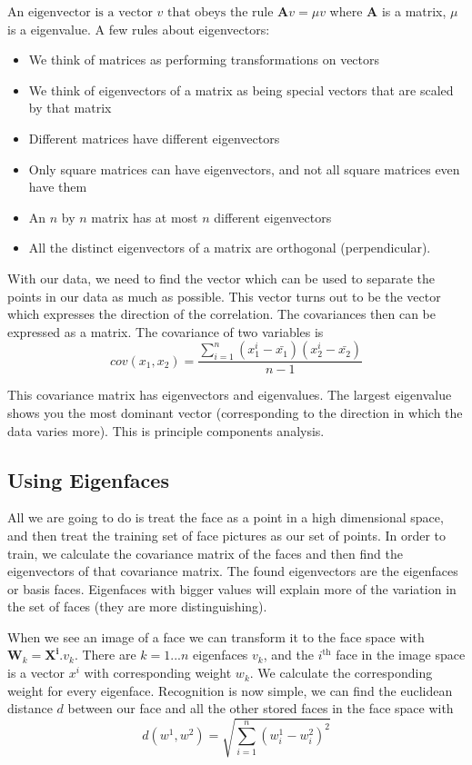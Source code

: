 \documentclass{article}
\begin{document}
		$\text{An eigenvector is a vector } v \text{ that obeys the rule } \mathbf{A}v = \mu v$ where $\mathbf{A}$ is a matrix, $\mu$ is a eigenvalue. A few rules about eigenvectors:
		\begin{itemize}
			\item We think of matrices as performing transformations on vectors
			\item We think of eigenvectors of a matrix as being special vectors that are scaled by that matrix
			\item Different matrices have different eigenvectors
			\item Only square matrices can have eigenvectors, and not all square matrices even have them
			\item An $n$ by $n$ matrix has at most $n$ different eigenvectors
			\item All the distinct eigenvectors of a matrix are orthogonal (perpendicular).
		\end{itemize}
		
	With our data, we need to find the vector which can be used to separate the points in our data as much as possible. This vector turns out to be the vector which expresses the direction of the correlation. The covariances then can be expressed as a matrix. The covariance of two variables is
	\[ cov(x_{1}, x_{2}) = \frac{\sum_{i=1}^{n}(x_{1}^{i} - \bar{x_{1}})(x_{2}^{i} - \bar{x_{2}})}{n - 1} \]	
	
	This covariance matrix has eigenvectors and eigenvalues. The largest eigenvalue shows you the most dominant vector (corresponding to the direction in which the data varies more). This is principle components analysis.
	
	\subsection{Using Eigenfaces}
	All we are going to do is treat the face as a point in a high dimensional space, and then treat the training set of face pictures as our set of points. In order to train, we calculate the covariance matrix of the faces and then find the eigenvectors of that covariance matrix. The found eigenvectors are the eigenfaces or basis faces. Eigenfaces with bigger values will explain more of the variation in the set of faces (they are more distinguishing).
	
	\par
	When we see an image of a face we can transform it to the face space with $\mathbf{W}_{k} = \mathbf{X}^{\mathbf{i}} . \mathit{v}_{k}$. There are $k=1...n$ eigenfaces $v_{k}$, and the $i^{\text{th}}$ face in the image space is a vector $x^{i}$ with corresponding weight $w_{k}$. We calculate the corresponding weight for every eigenface. Recognition is now simple, we can find the euclidean distance $d$ between our face and all the other stored faces in the face space with \[ d(w^{1}, w^{2}) = \sqrt{\sum_{i=1}^{n}(w_{i}^{1} - w_{i}^{2})^{2}} \]
	
\end{document}
